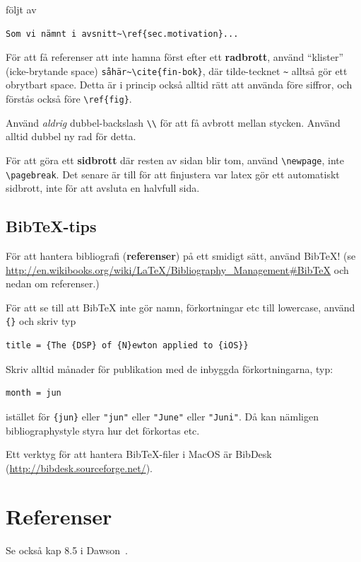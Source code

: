 \documentclass[swedish, a4paper,12pt]{article}
\begin{document}
följt av
\begin{verbatim}
Som vi nämnt i avsnitt~\ref{sec.motivation}...
\end{verbatim}

För att få referenser att inte hamna först efter ett \textbf{radbrott}, använd ``klister'' (icke-brytande space) \verb|såhär~\cite{fin-bok}|, där tilde-tecknet \verb|~| alltså gör ett obrytbart space. Detta är i princip också alltid rätt att använda före siffror, och förstås också före \verb|\ref{fig}|.

Använd \emph{aldrig} dubbel-backslash \verb|\\| för att få avbrott mellan stycken. Använd alltid dubbel ny rad för detta.

För att göra ett \textbf{sidbrott} där resten av sidan blir tom, använd \verb|\newpage|, inte \verb|\pagebreak|. Det senare är till för att finjustera var latex gör ett automatiskt sidbrott, inte för att avsluta en halvfull sida.

\subsection{Bib\TeX-tips}

För att hantera bibliografi (\textbf{referenser}) på ett smidigt sätt, använd BibTeX! (se \url{http://en.wikibooks.org/wiki/LaTeX/Bibliography_Management#BibTeX} och nedan om referenser.)

För att se till att BibTeX inte gör namn, förkortningar etc till lowercase, använd \verb|{}| och skriv typ
\begin{verbatim}
title = {The {DSP} of {N}ewton applied to {iOS}}
\end{verbatim}

Skriv alltid månader för publikation med de inbyggda förkortningarna, typ:
\begin{verbatim}
month = jun
\end{verbatim}
istället för \verb|{jun}| eller \verb|"jun"| eller \verb|"June"| eller \verb|"Juni"|. Då kan nämligen bibliographystyle styra hur det förkortas etc.

Ett verktyg för att hantera BibTeX-filer i MacOS är BibDesk (\url{http://bibdesk.sourceforge.net/}).


\section{Referenser}
\label{sec:referenser}

Se också kap 8.5 i Dawson~\cite{dawson:projects-in-computing}.
\end{document}

